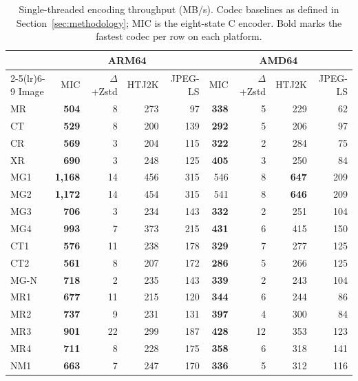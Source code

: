 \documentclass[journal]{IEEEtran}
\begin{document}
\begin{table}[htbp]
\centering
\caption{Single-threaded encoding throughput (MB/s). Codec
baselines as defined in Section~\ref{sec:methodology}; MIC is the
eight-state C encoder. Bold marks the fastest codec per row on each
platform.}
\label{tab:enc}
\scriptsize
\begin{tabular}{l|rrrr|rrrr}
\toprule
 & \multicolumn{4}{c|}{ARM64} & \multicolumn{4}{c}{AMD64} \\
\cmidrule(lr){2-5}\cmidrule(lr){6-9}
Image & MIC & $\Delta$+Zstd & HTJ2K & JPEG-LS & MIC & $\Delta$+Zstd & HTJ2K & JPEG-LS \\
\midrule
MR   & \textbf{504}   &  8 & 273 &  97 & \textbf{338} &  5 & 229          &  62 \\
CT   & \textbf{529}   &  8 & 200 & 139 & \textbf{292} &  5 & 206          &  97 \\
CR   & \textbf{569}   &  3 & 204 & 115 & \textbf{322} &  2 & 284          &  75 \\
XR   & \textbf{690}   &  3 & 248 & 125 & \textbf{405} &  3 & 250          &  84 \\
MG1  & \textbf{1{,}168} & 14 & 456 & 315 & 546          &  8 & \textbf{647} & 209 \\
MG2  & \textbf{1{,}172} & 14 & 454 & 315 & 541          &  8 & \textbf{646} & 209 \\
MG3  & \textbf{706}   &  3 & 234 & 143 & \textbf{332} &  2 & 251          & 104 \\
MG4  & \textbf{993}   &  7 & 373 & 215 & \textbf{431} &  6 & 415          & 150 \\
CT1  & \textbf{576}   & 11 & 238 & 178 & \textbf{329} &  7 & 277          & 125 \\
CT2  & \textbf{561}   &  8 & 207 & 172 & \textbf{286} &  5 & 266          & 125 \\
MG-N & \textbf{718}   &  2 & 235 & 143 & \textbf{339} &  2 & 243          & 104 \\
MR1  & \textbf{677}   & 11 & 215 & 120 & \textbf{344} &  6 & 244          &  86 \\
MR2  & \textbf{737}   &  9 & 231 & 131 & \textbf{397} &  4 & 300          &  84 \\
MR3  & \textbf{901}   & 22 & 299 & 187 & \textbf{428} & 12 & 353          & 123 \\
MR4  & \textbf{711}   &  8 & 228 & 175 & \textbf{358} &  6 & 318          & 141 \\
NM1  & \textbf{663}   &  7 & 247 & 170 & \textbf{336} &  5 & 312          & 116 \\

\end{tabular}
\end{table}
\end{document}
